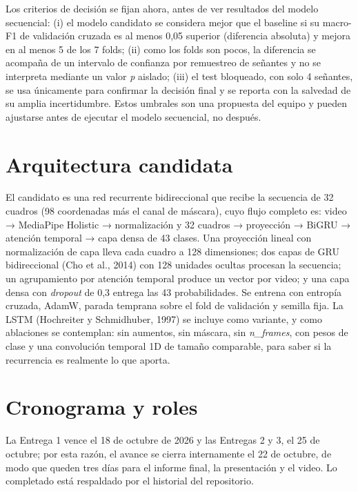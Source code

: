 \documentclass[11pt,a4paper]{article}
\newcommand{\code}[1]{\textit{#1}}
\begin{document}
Los criterios de decisión se fijan ahora, antes de ver resultados del modelo secuencial: (i) el modelo candidato se considera mejor que el baseline si su macro-F1 de validación cruzada es al menos 0,05 superior (diferencia absoluta) y mejora en al menos 5 de los 7 folds; (ii) como los folds son pocos, la diferencia se acompaña de un intervalo de confianza por remuestreo de señantes y no se interpreta mediante un valor \emph{p} aislado; (iii) el test bloqueado, con solo 4 señantes, se usa únicamente para confirmar la decisión final y se reporta con la salvedad de su amplia incertidumbre. Estos umbrales son una propuesta del equipo y pueden ajustarse antes de ejecutar el modelo secuencial, no después.

\section{Arquitectura candidata}

El candidato es una red recurrente bidireccional que recibe la secuencia de 32 cuadros (98 coordenadas más el canal de máscara), cuyo flujo completo es: video → MediaPipe Holistic → normalización y 32 cuadros → proyección → BiGRU → atención temporal → capa densa de 43 clases. Una proyección lineal con normalización de capa lleva cada cuadro a 128 dimensiones; dos capas de GRU bidireccional (Cho et al., 2014) con 128 unidades ocultas procesan la secuencia; un agrupamiento por atención temporal produce un vector por video; y una capa densa con \emph{dropout} de 0,3 entrega las 43 probabilidades. Se entrena con entropía cruzada, AdamW, parada temprana sobre el fold de validación y semilla fija. La LSTM (Hochreiter y Schmidhuber, 1997) se incluye como variante, y como ablaciones se contemplan: sin aumentos, sin máscara, sin \code{n\_frames}, con pesos de clase y una convolución temporal 1D de tamaño comparable, para saber si la recurrencia es realmente lo que aporta.



\section{Cronograma y roles}

La Entrega 1 vence el 18 de octubre de 2026 y las Entregas 2 y 3, el 25 de octubre; por esta razón, el avance se cierra internamente el 22 de octubre, de modo que queden tres días para el informe final, la presentación y el video. Lo completado está respaldado por el historial del repositorio.
\end{document}
